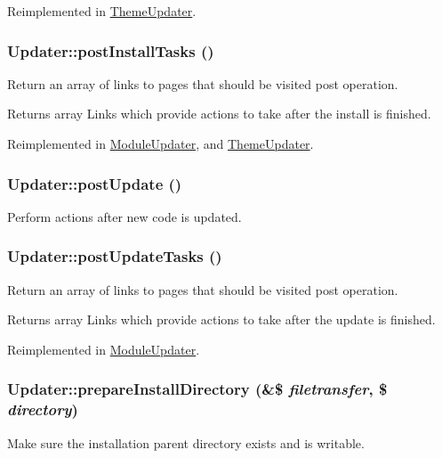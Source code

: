 Reimplemented in \hyperlink{classThemeUpdater_a66e74f3e7f7116e77355947e11d038e1}{ThemeUpdater}.\hypertarget{classUpdater_a59eb832c6bb80dd9f04fc85c8ebe8905}{
\subsubsection[{postInstallTasks}]{\setlength{\rightskip}{0pt plus 5cm}Updater::postInstallTasks ()}}
\label{classUpdater_a59eb832c6bb80dd9f04fc85c8ebe8905}
Return an array of links to pages that should be visited post operation.

\begin{DoxyReturn}{Returns}
array Links which provide actions to take after the install is finished. 
\end{DoxyReturn}


Reimplemented in \hyperlink{classModuleUpdater_aca197ac3c04662e4c56c26e839fe01d7}{ModuleUpdater}, and \hyperlink{classThemeUpdater_a0ed994865cfa41230a515aa3d759e693}{ThemeUpdater}.\hypertarget{classUpdater_a68cf9e613e06963f0fa6d0f1779f36e7}{
\subsubsection[{postUpdate}]{\setlength{\rightskip}{0pt plus 5cm}Updater::postUpdate ()}}
\label{classUpdater_a68cf9e613e06963f0fa6d0f1779f36e7}
Perform actions after new code is updated. \hypertarget{classUpdater_a377feb2830d31884f8ff1ff152d94576}{
\subsubsection[{postUpdateTasks}]{\setlength{\rightskip}{0pt plus 5cm}Updater::postUpdateTasks ()}}
\label{classUpdater_a377feb2830d31884f8ff1ff152d94576}
Return an array of links to pages that should be visited post operation.

\begin{DoxyReturn}{Returns}
array Links which provide actions to take after the update is finished. 
\end{DoxyReturn}


Reimplemented in \hyperlink{classModuleUpdater_a120524659a6f049fd27dbf487a61af0e}{ModuleUpdater}.\hypertarget{classUpdater_a79c3ae76bfdfa5f763978196055086dd}{
\subsubsection[{prepareInstallDirectory}]{\setlength{\rightskip}{0pt plus 5cm}Updater::prepareInstallDirectory (\&\$ {\em filetransfer}, \/  \$ {\em directory})}}
\label{classUpdater_a79c3ae76bfdfa5f763978196055086dd}
Make sure the installation parent directory exists and is writable.


